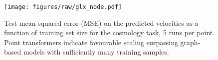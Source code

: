 \begin{figure}
    \centering
    \texttt{[image: figures/raw/glx\_node.pdf]}
    \vspace{-6pt}
    \caption{Test mean-squared error (MSE) on the predicted velocities as a function of training set size for the cosmology task, 5 runs per point. Point transformers indicate favourable scaling surpassing graph-based models with sufficiently many training samples.}
    \label{fig:glx_results}
\end{figure}
